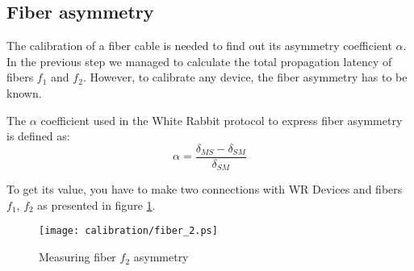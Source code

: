 \subsection{Fiber asymmetry}
\label{subsec:fiasym}

The calibration of a fiber cable is needed to find out its asymmetry coefficient
$\alpha$. In the previous step we managed to calculate the total propagation
latency of fibers $f_1$ and $f_2$. However, to calibrate any device, the fiber
asymmetry has to be known.

The $\alpha$ coefficient used in the White Rabbit protocol to express fiber 
asymmetry is defined as:
\begin{equation}
	\alpha = \frac{\delta_{MS} - \delta_{SM}}{\delta_{SM}}
\end{equation}

To get its value, you have to make two connections with WR Devices and fibers
$f_1$, $f_2$ as presented in figure \ref{fig:fiasym}.

\begin{figure}[ht]
	\begin{center}
		\texttt{[image: calibration/fiber\_2.ps]}
		\caption{Measuring fiber $f_2$ asymmetry}
		\label{fig:fiasym}
	\end{center}
\end{figure}

